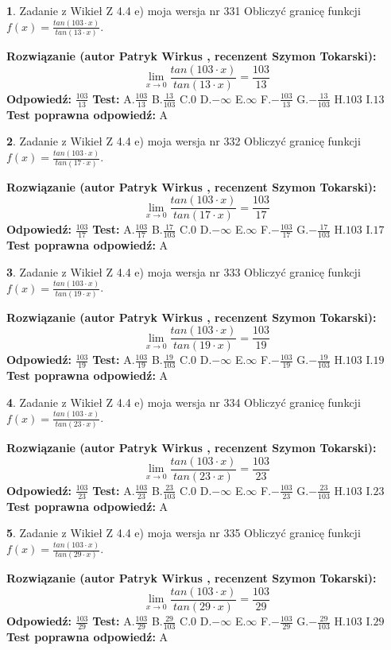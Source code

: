 \documentclass[12pt, a4paper]{article}
\theoremstyle{definition} %
\newtheorem{zad}{}
\newcommand{\zadStart}[1]{\begin{zad}#1\newline}
\newcommand{\zadStop}{\end{zad}}
\newcommand{\rozwStart}[2]{\noindent \textbf{Rozwiązanie (autor #1 , recenzent #2): }\newline}
\newcommand{\rozwStop}{\newline}
\newcommand{\odpStart}{\noindent \textbf{Odpowiedź:}\newline}
\newcommand{\odpStop}{\newline}
\newcommand{\testStart}{\noindent \textbf{Test:}\newline}
\newcommand{\testStop}{\newline}
\newcommand{\kluczStart}{\noindent \textbf{Test poprawna odpowiedź:}\newline}
\newcommand{\kluczStop}{\newline}
\begin{document}
\zadStart{Zadanie z Wikieł Z 4.4 e) moja wersja nr 331}
Obliczyć granicę funkcji $f(x)=\frac{tan(103\cdot x)}{tan(13\cdot x)}$.
\zadStop
\rozwStart{Patryk Wirkus}{Szymon Tokarski}
$$\lim\limits_{x\to 0}\frac{tan(103\cdot x)}{tan(13\cdot x)}=
\frac{103}{13}$$
\rozwStop
\odpStart
$\frac{103}{13}$
\odpStop
\testStart
A.$\frac{103}{13}$
B.$\frac{13}{103}$
C.$0$
D.$-\infty$
E.$\infty$
F.$-\frac{103}{13}$
G.$-\frac{13}{103}$
H.$103$
I.$13$
\testStop
\kluczStart
A
\kluczStop



\zadStart{Zadanie z Wikieł Z 4.4 e) moja wersja nr 332}
Obliczyć granicę funkcji $f(x)=\frac{tan(103\cdot x)}{tan(17\cdot x)}$.
\zadStop
\rozwStart{Patryk Wirkus}{Szymon Tokarski}
$$\lim\limits_{x\to 0}\frac{tan(103\cdot x)}{tan(17\cdot x)}=
\frac{103}{17}$$
\rozwStop
\odpStart
$\frac{103}{17}$
\odpStop
\testStart
A.$\frac{103}{17}$
B.$\frac{17}{103}$
C.$0$
D.$-\infty$
E.$\infty$
F.$-\frac{103}{17}$
G.$-\frac{17}{103}$
H.$103$
I.$17$
\testStop
\kluczStart
A
\kluczStop



\zadStart{Zadanie z Wikieł Z 4.4 e) moja wersja nr 333}
Obliczyć granicę funkcji $f(x)=\frac{tan(103\cdot x)}{tan(19\cdot x)}$.
\zadStop
\rozwStart{Patryk Wirkus}{Szymon Tokarski}
$$\lim\limits_{x\to 0}\frac{tan(103\cdot x)}{tan(19\cdot x)}=
\frac{103}{19}$$
\rozwStop
\odpStart
$\frac{103}{19}$
\odpStop
\testStart
A.$\frac{103}{19}$
B.$\frac{19}{103}$
C.$0$
D.$-\infty$
E.$\infty$
F.$-\frac{103}{19}$
G.$-\frac{19}{103}$
H.$103$
I.$19$
\testStop
\kluczStart
A
\kluczStop



\zadStart{Zadanie z Wikieł Z 4.4 e) moja wersja nr 334}
Obliczyć granicę funkcji $f(x)=\frac{tan(103\cdot x)}{tan(23\cdot x)}$.
\zadStop
\rozwStart{Patryk Wirkus}{Szymon Tokarski}
$$\lim\limits_{x\to 0}\frac{tan(103\cdot x)}{tan(23\cdot x)}=
\frac{103}{23}$$
\rozwStop
\odpStart
$\frac{103}{23}$
\odpStop
\testStart
A.$\frac{103}{23}$
B.$\frac{23}{103}$
C.$0$
D.$-\infty$
E.$\infty$
F.$-\frac{103}{23}$
G.$-\frac{23}{103}$
H.$103$
I.$23$
\testStop
\kluczStart
A
\kluczStop



\zadStart{Zadanie z Wikieł Z 4.4 e) moja wersja nr 335}
Obliczyć granicę funkcji $f(x)=\frac{tan(103\cdot x)}{tan(29\cdot x)}$.
\zadStop
\rozwStart{Patryk Wirkus}{Szymon Tokarski}
$$\lim\limits_{x\to 0}\frac{tan(103\cdot x)}{tan(29\cdot x)}=
\frac{103}{29}$$
\rozwStop
\odpStart
$\frac{103}{29}$
\odpStop
\testStart
A.$\frac{103}{29}$
B.$\frac{29}{103}$
C.$0$
D.$-\infty$
E.$\infty$
F.$-\frac{103}{29}$
G.$-\frac{29}{103}$
H.$103$
I.$29$
\testStop
\kluczStart
A
\kluczStop
\end{document}
